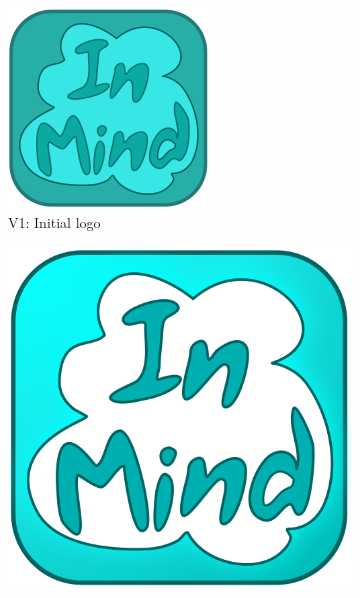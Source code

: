   \begin{figure}
    \caption{\textbf{Evolution of the InMind logo} --
    On feedback from users, the icon evolved to better fit what users expect from
    mobile applications.
    }
    \centering
    \begin{subfigure}[b]{0.25\textwidth}
      \includegraphics[width=\textwidth]{inmind_logo0.png}
      \caption{V1: Initial logo}
    \end{subfigure}
    \begin{subfigure}[b]{0.25\textwidth}
      \includegraphics[width=\textwidth]{inmind_logo1.png}

\end{subfigure}
\end{figure}
